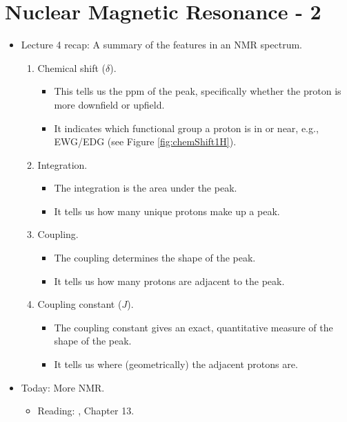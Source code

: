 \documentclass[../notes.tex]{subfiles}
\begin{document}
\section{Nuclear Magnetic Resonance - 2}
\begin{itemize}
    \item {}Lecture 4 recap: A summary of the features in an NMR spectrum.
    \begin{enumerate}
        \item Chemical shift ($\delta$).
        \begin{itemize}
            \item This tells us the ppm of the peak, specifically whether the proton is more downfield or upfield.
            \item It indicates which functional group a proton is in or near, e.g., EWG/EDG (see Figure \ref{fig:chemShift1H}).
        \end{itemize}
        \item Integration.
        \begin{itemize}
            \item The integration is the area under the peak.
            \item It tells us how many unique protons make up a peak.
        \end{itemize}
        \item Coupling.
        \begin{itemize}
            \item The coupling determines the shape of the peak.
            \item It tells us how many protons are adjacent to the peak.
        \end{itemize}
        \item Coupling constant ($J$).
        \begin{itemize}
            \item The coupling constant gives an exact, quantitative measure of the shape of the peak.
            \item It tells us where (geometrically) the adjacent protons are.
        \end{itemize}
    \end{enumerate}
    \item Today: More NMR.
    \begin{itemize}
        \item Reading: \textcite{bib:Clayden}, Chapter 13.

\end{itemize}
\end{itemize}
\end{document}
